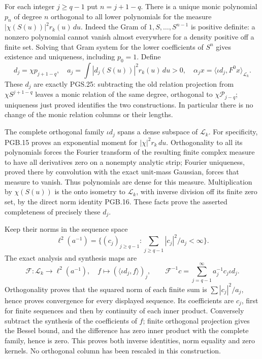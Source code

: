 For each integer $j\geq q-1$ put $n=j+1-q$. There is a unique monic
polynomial $p_n$ of degree $n$ orthogonal to all lower polynomials
for the measure $|\chi(S(u))|^2r_k(u)\,du$. Indeed the Gram of
$1,S,\ldots,S^{n-1}$ is positive definite: a nonzero polynomial
cannot vanish almost everywhere for a density positive off a finite
set. Solving that Gram system for the lower coefficients of
$S^n$ gives existence and uniqueness, including $p_0=1$. Define
\[
 d_j=\chi p_{j+1-q},\quad
 a_j=\int|d_j(S(u))|^2r_k(u)\,du>0,\quad
 \alpha_jx=\langle\iota d_j,F^0x\rangle_{\mathscr L_k}.
\tag{PGRT.3}\label{eq:pgrt-relation-coefficients}
\]
These $d_j$ are exactly PGS.25: subtracting the old relation
projection from $\chi S^{j+1-q}$ leaves a monic relation of the
same degree, orthogonal to $\chi\mathcal P_{j-q}$; uniqueness
just proved identifies the two constructions. In particular
there is no change of the monic relation columns or their lengths.

The complete orthogonal family $\iota d_j$ spans a dense subspace
of $\mathscr L_k$. For specificity, PGB.15 proves an exponential
moment for $|\chi|^2r_k\,du$. Orthogonality to all its polynomials
forces the Fourier transform of the resulting finite complex
measure to have all derivatives zero on a nonempty analytic strip;
Fourier uniqueness, proved there by convolution with the exact
unit-mass Gaussian, forces that measure to vanish. Thus polynomials
are dense for this measure. Multiplication by $\chi(S(u))$ is
the onto isometry to $\mathscr L_k$, with inverse division off
its finite zero set, by the direct norm identity PGB.16. These
facts prove the asserted completeness of precisely these $d_j$.

Keep their norms in the sequence space
\[
 \ell^2(a^{-1})=
 \{(c_j)_{j\geq q-1}:\sum_{j\geq q-1}|c_j|^2/a_j<\infty\}.
\]
The exact analysis and synthesis maps are
\[
 \mathcal F:\mathscr L_k\longrightarrow\ell^2(a^{-1}),
 \quad f\longmapsto(\langle\iota d_j,f\rangle)_j,
 \qquad
 \mathcal F^{-1}c=\sum_{j=q-1}^{\infty}a_j^{-1}c_j\iota d_j.
\tag{PGRT.4}\label{eq:pgrt-analysis}
\]
Orthogonality proves that the squared norm of each finite sum is
$\sum|c_j|^2/a_j$, hence proves convergence for every displayed
sequence. Its coefficients are $c_j$, first for finite sequences
and then by continuity of each inner product. Conversely subtract
the synthesis of the coefficients of $f$; finite orthogonal
projection gives the Bessel bound, and the difference has zero
inner product with the complete family, hence is zero. This proves
both inverse identities, norm equality and zero kernels. No
orthogonal column has been rescaled in this construction.

